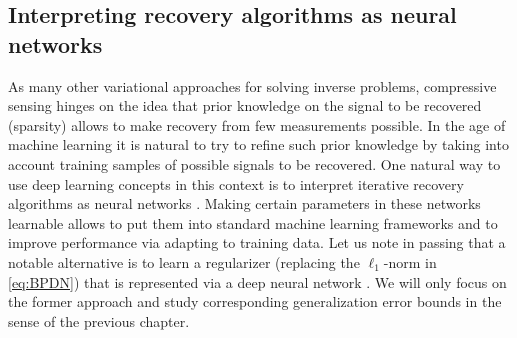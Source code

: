 \documentclass{svproc}
\newcommand{\bW}{\boldsymbol{W}}
\newcommand{\0}{\boldsymbol{0}}
\newcommand{\1}{\boldsymbol{1}}
\begin{document}


\subsection{
Interpreting recovery algorithms as neural networks}



As many other variational approaches for solving inverse problems, compressive sensing hinges on the idea that prior knowledge on the signal to be recovered (sparsity) allows to make recovery from few measurements possible. In the age of machine learning it is natural to try to refine such prior knowledge by taking into account training samples of possible signals to be recovered. 
One natural way to use deep learning concepts in this context is to interpret iterative recovery algorithms as neural networks \cite{gregor2010learning}. Making certain parameters in these networks learnable allows to put them
into standard machine learning frameworks and to improve performance via adapting to training data. Let us note in passing that a notable alternative is to learn a regularizer (replacing the $\ell_1$-norm in \eqref{eq:BPDN}) that is represented via a deep neural network \cite{maass2019}. We will only focus on the former approach and study corresponding generalization error bounds \cite{schnoor2023generalization} in the sense of the previous chapter.
\end{document}

